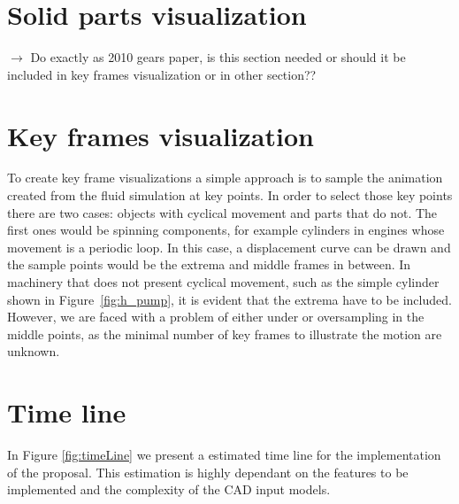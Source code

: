 \section{Solid parts visualization}

$\rightarrow$ Do exactly as 2010 gears paper, is this section needed or should it be included in key frames visualization or in other section??


\section{Key frames visualization}

To create key frame visualizations a simple approach is to sample the animation created from the fluid simulation at key points.
In order to select those key points there are two cases: objects with cyclical movement and parts that do not.
The first ones would be spinning components, for example cylinders in engines whose movement is a periodic loop.
In this case, a displacement curve can be drawn and the sample points would be the extrema and middle frames in between.
In machinery that does not present cyclical movement, such as the simple cylinder shown in Figure~\ref{fig:h_pump}, it is evident that the extrema have to be included.
However, we are faced with a problem of either under or oversampling in the middle points, as the minimal number of key frames to illustrate the motion are unknown. 

\section{Time line}

In Figure \ref{fig:timeLine} we present a estimated time line for the implementation of the proposal.
This estimation is highly dependant on the features to be implemented and the complexity of the CAD input models.

